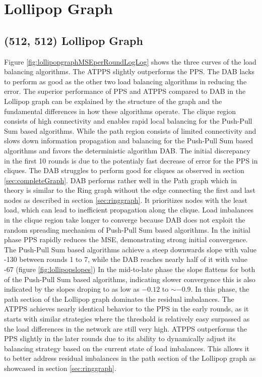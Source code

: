  \section{Lollipop Graph}\label{sec:lollipopgraph}
\subsection{(512, 512) Lollipop Graph}
Figure \ref{fig:lollipopgraphMSEperRoundLogLog} shows the three curves of the load balancing algorithms. The ATPPS slightly outperforms the PPS. The DAB lacks to perform as good as the other two load balancing algorithms in reducing the error. The superior performance of PPS and ATPPS compared to DAB in the Lollipop graph can be explained by the structure of the graph and the fundamental differences in how these algorithms operate. The clique region consists of high connectivity and enables rapid local balancing for the  Push-Pull Sum based algorithms. While the path region consists of limited connectivity and slows down information propagation and balancing for the Push-Pull Sum based algorithms and favors the deterministic algorithm DAB. The initial discrepancy in the first 10 rounds is due to the potentialy fast decrease of error for the PPS in cliques. The DAB struggles to perform good for cliques as observed in section \ref{sec:completeGraph}. DAB performs rather well in the Path graph which in theory is similar to the Ring graph without the edge connecting the first and last nodes as described in section \ref{sec:ringgraph}. It prioritizes nodes with the least load, which can lead to inefficient propagation along the clique. Load imbalances in the clique region take longer to converge because DAB does not exploit the random spreading mechanism of Push-Pull Sum based algorithms. In the initial phase PPS rapidly reduces the MSE, demonstrating strong initial convergence. The Push-Pull Sum based algorithms achieve a steep downwards slope with value -130 between rounds 1 to 7, while the DAB reaches nearly half of it with value -67 (figure \ref{fig:lollipopslopes}) In the mid-to-late phase the slope flattens for both of the Push-Pull Sum based algorithms, indicating slower convergence this is also indicated by the slopes droping to as low as $-0.12$ to $\sim-0.9$. In this phase, the path section of the Lollipop graph dominates the residual imbalances. The ATPPS achieves nearly identical behavior to the PPS in the early rounds, as it starts with similar strategies where the threshold is relatively easy surpassed as the load differences in the network are still very high. ATPPS outperforms the PPS slightly in the later rounds due to its ability to dynamically adjust its balancing strategy based on the current state of load imbalances. This allows it to better address residual imbalances in the path section of the Lollipop graph as showcased in section \ref{sec:ringgraph}.

